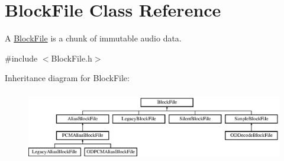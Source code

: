 \hypertarget{class_block_file}{}\section{Block\+File Class Reference}
\label{class_block_file}


A \hyperlink{class_block_file}{Block\+File} is a chunk of immutable audio data.  




{\ttfamily \#include $<$Block\+File.\+h$>$}

Inheritance diagram for Block\+File\+:\begin{figure}[H]
\begin{center}
\leavevmode
\includegraphics[height=3.047619cm]{class_block_file}
\end{center}
\end{figure}
